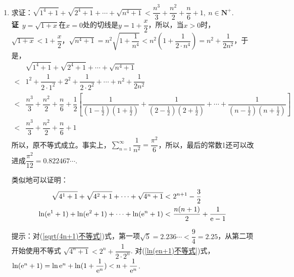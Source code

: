 \begin{enumerate}[label={【\textbf{例\thechapter.\arabic*}】},
 leftmargin=\inteval{\myenumleftmargin}pt,
 itemsep=\inteval{\myenumitempsep}pt,
 itemindent=\inteval{\myenumitemindent}pt]
\item 求证：$ \sqrt{1^4+1}+\sqrt{2^4+1}+\cdots+\sqrt{n^4+1}<\dfrac{n^3}{3}+\dfrac{n^2}{2}+
\dfrac{n}{6}+1 ,\ n\in \textbf{N}^+ $. \\
\textbf{证}\ $ y=\sqrt{1+x} $在$ x=0 $处的切线是$ y=1+\dfrac{x}{2} $，所以，当$ x>0 $时，
$ \sqrt{1+x}<1+\dfrac{x}{2} $，$ \sqrt{n^4+1}=n^2\sqrt{1+\dfrac{1}{n^4}}
<n^2\left(1+\dfrac{1}{2\cdot n^4}\right)=n^2+\dfrac{1}{2n^2} $，于是，
\begin{align*}
    &\sqrt{1^4+1}+\sqrt{2^4+1}+\cdots+\sqrt{n^4+1} \\
    <& 1^2+\dfrac{1}{2\cdot 1^2}+2^2+\dfrac{1}{2\cdot 2^2} +\cdots + n^2+\dfrac{1}{2n^2} \\
    <& \dfrac{n^3}{3}+\dfrac{n^2}{2}+\dfrac{n}{6}+\dfrac{1}{2}\left[\dfrac{1}{(1-\frac{1}{2})(1+\frac{1}{2})}+\dfrac{1}{(2-\frac{1}{2})(2+\frac{1}{2})}
    +\cdots+\dfrac{1}{(n-\frac{1}{2})(n+\frac{1}{2})}\right] \\
    <& \dfrac{n^3}{3}+\dfrac{n^2}{2}+\dfrac{n}{6}+1
\end{align*}
所以，原不等式成立。事实上，$ \sum\limits_{n=1}^{\infty}\dfrac{1}{n^2}=
\dfrac{\pi^2}{6} $，所以，最后的常数1还可以改进成$ \dfrac{\pi^2}{12}=0.822467\cdots $.

类似地可以证明：
\begin{align}
    \sqrt{4^1+1}+\sqrt{4^2+1}+\cdots+\sqrt{4^n+1}<&\ 2^{n+1}-\dfrac{3}{2} 
    \label{sqrt(4n+1)不等式}   \\
    \ln(\e^1+1)+\ln(\e^2+1)+\cdots+\ln(\e^n+1)<&\ \dfrac{n(n+1)}{2}+\dfrac{1}{\e-1}    \label{ln(en+1)不等式} 
\end{align}

提示：对(\ref{sqrt(4n+1)不等式})式，第一项$ \sqrt{5}=2.236\cdots<
\dfrac{9}{4}=2.25 $，从第二项开始使用不等式
$ \sqrt{4^n+1}<2^n+\dfrac{1}{2\cdot 2^n} $. 
对(\ref{ln(en+1)不等式})式，$ \ln(\mathrm{e}^n+1)=\ln \mathrm{e}^n+
\ln(1+\dfrac{1}{\mathrm{e}^n})<n+\dfrac{1}{\mathrm{e}^n} $. 


\end{enumerate}
